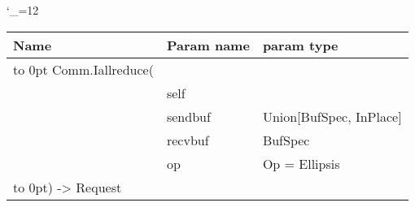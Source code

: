 \begingroup \catcode`\_=12 \tt
\begin{tabular}{lll}
\toprule
\textrm{Name}&\textrm{Param name}&\textrm{param type}\\
\midrule
\hbox to 0pt {Comm.Iallreduce(\hss}\\
& self\\
& sendbuf & Union[BufSpec, InPlace]\\
& recvbuf & BufSpec\\
& op & Op = Ellipsis\\
\hbox to 0pt{) -> Request\hss}\\
\bottomrule
\end{tabular}
\endgroup
